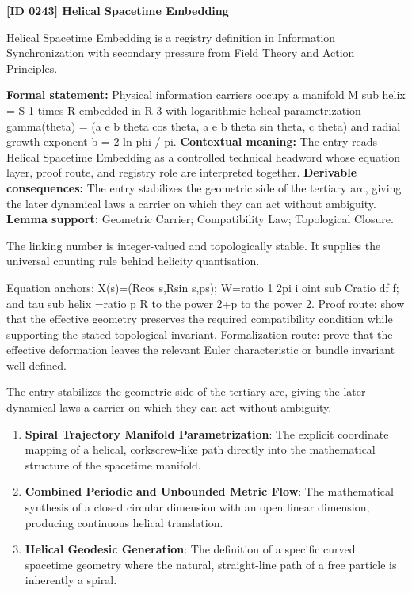 \clearpage
\noindent\textbf{[ID 0243] Helical Spacetime Embedding}\par
\vspace{0.35em}
\begingroup\small
{}
Helical Spacetime Embedding is a registry definition in Information Synchronization with secondary pressure from Field Theory and Action Principles.

\begingroup\footnotesize\setlength{\emergencystretch}{3em}\sloppy
\textbf{Formal statement:} Physical information carriers occupy a manifold M sub helix = S 1 times R embedded in R 3 with logarithmic-helical parametrization gamma(theta) = (a e b theta cos theta, a e b theta sin theta, c theta) and radial growth exponent b = 2 ln phi / pi. \textbf{Contextual meaning:} The entry reads Helical Spacetime Embedding as a controlled technical headword whose equation layer, proof route, and registry role are interpreted together. \textbf{Derivable consequences:} The entry stabilizes the geometric side of the tertiary arc, giving the later dynamical laws a carrier on which they can act without ambiguity. \textbf{Lemma support:} Geometric Carrier; Compatibility Law; Topological Closure.\par
\endgroup

The linking number is integer-valued and topologically stable. It supplies the universal counting rule behind helicity quantisation.

Equation anchors: X(s)=(Rcos s,Rsin s,ps); W=ratio 1 2pi i oint sub Cratio df f; and tau sub helix =ratio p R to the power 2+p to the power 2. Proof route: show that the effective geometry preserves the required compatibility condition while supporting the stated topological invariant. Formalization route: prove that the effective deformation leaves the relevant Euler characteristic or bundle invariant well-defined.

The entry stabilizes the geometric side of the tertiary arc, giving the later dynamical laws a carrier on which they can act without ambiguity.
\endgroup

\begin{enumerate}[leftmargin=1.6em,itemsep=6pt,topsep=4pt]
\item \textbf{Spiral Trajectory Manifold Parametrization}: The explicit coordinate mapping of a helical, corkscrew-like path directly into the mathematical structure of the spacetime manifold.
\item \textbf{Combined Periodic and Unbounded Metric Flow}: The mathematical synthesis of a closed circular dimension with an open linear dimension, producing continuous helical translation.
\item \textbf{Helical Geodesic Generation}: The definition of a specific curved spacetime geometry where the natural, straight-line path of a free particle is inherently a spiral.
\end{enumerate}

